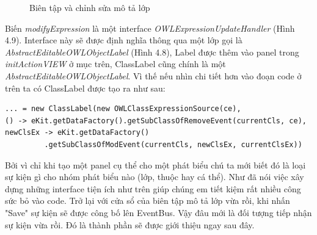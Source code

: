 \begin{figure}[h!]
	\centering
	\caption{Biên tập và chỉnh sửa mô tả lớp\label{overflow}}
\end{figure}
Biến \textit{modifyExpression} là một interface \textit{OWLExpressionUpdateHandler} (Hình 4.9).  Interface này sẽ được định nghĩa thông qua một lớp gọi là \textit{AbstractEditableOWLObjectLabel} (Hình 4.8), Label được thêm vào panel trong \textit{initActionVIEW} ở mục trên, ClassLabel cũng chính là một \textit{AbstractEditableOWLObjectLabel}. Vì thế nếu nhìn chi tiết hơn vào đoạn code ở trên ta có ClassLabel được tạo ra như sau:
\begin{verbatim}
... = new ClassLabel(new OWLClassExpressionSource(ce),
() -> eKit.getDataFactory().getSubClassOfRemoveEvent(currentCls, ce),
newClsEx -> eKit.getDataFactory()
         .getSubClassOfModEvent(currentCls, newClsEx, currentClsEx))
\end{verbatim}
Bởi vì chỉ khi tạo một panel cụ thể cho một phát biểu chú ta mới biết đó là loại sự kiện gì cho nhóm phát biểu nào (lớp, thuộc hay cá thể). Như đã nói việc xây dựng những interface tiện ích như trên giúp chúng em tiết kiệm rất nhiều công sức bỏ vào code. Trở lại với cửa sổ của biên tập mô tả lớp vừa rồi, khi nhấn "Save" sự kiện sẽ được công bố lên EventBus. Vậy đâu mới là đối tượng tiếp nhận sự kiện vừa rồi. Đó là thành phần sẽ được giới thiệu ngay sau đây.

